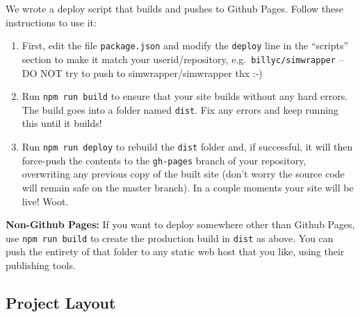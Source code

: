 We wrote a deploy script that builds and pushes to Github Pages. Follow
these instructions to use it:

\begin{enumerate}
\def\labelenumi{\arabic{enumi}.}
\item
  First, edit the file \texttt{package.json} and modify the
  \texttt{deploy} line in the ``scripts'' section to make it match your
  userid/repository, e.g.~\texttt{billyc/simwrapper} -- DO NOT try to
  push to simwrapper/simwrapper thx :-)
\item
  Run \texttt{npm\ run\ build} to ensure that your site builds without
  any hard errors. The build goes into a folder named \texttt{dist}. Fix
  any errors and keep running this until it builds!
\item
  Run \texttt{npm\ run\ deploy} to rebuild the \texttt{dist} folder and,
  if successful, it will then force-push the contents to the
  \texttt{gh-pages} branch of your repository, overwriting any previous
  copy of the built site (don't worry the source code will remain safe
  on the master branch). In a couple moments your site will be live!
  Woot.
\end{enumerate}

\textbf{Non-Github Pages:} If you want to deploy somewhere other than
Github Pages, use \texttt{npm\ run\ build} to create the production
build in \texttt{dist} as above. You can push the entirety of that
folder to any static web host that you like, using their publishing
tools.

\hypertarget{project-layout}{%
\subsection{Project Layout}\label{project-layout}}

